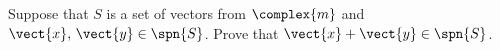 Suppose that $S$ is a set of vectors from $\complex{m}$ and $\vect{x},\,\vect{y}\in\spn{S}$.  Prove that $\vect{x}+\vect{y}\in\spn{S}$.